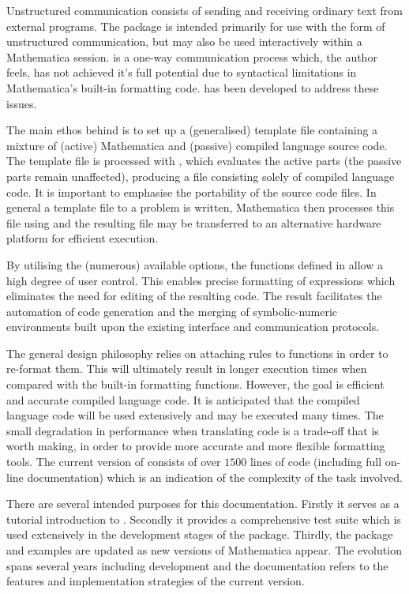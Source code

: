 \documentclass [12pt,twoside]{article}
\begin{document}
Unstructured communication consists of sending and receiving ordinary
text from external programs. The package  is intended
primarily for use with the  form of unstructured
communication, but may also be used interactively within a Mathematica
session.  is a one-way communication process which, the
author feels, has not achieved it's full potential due to syntactical
limitations in Mathematica's built-in formatting code.  has
been developed to address these issues.

The main ethos behind  is to set up a (generalised) template
file containing a mixture of (active) Mathematica and (passive) compiled
language source code. The template file is processed with ,
which evaluates the active parts (the passive parts remain unaffected),
producing a file consisting solely of compiled language code. It is important
to emphasise the portability of the source code files. In general a template
file to a problem is written, Mathematica then processes this file using
 and the resulting file may be transferred to an alternative
hardware platform for efficient execution.

By utilising the (numerous) available options, the functions defined in
 allow a high degree of user control. This enables precise
formatting of expressions which eliminates the need for editing of the resulting
code. The result facilitates the automation of code generation and the merging of
symbolic-numeric environments built upon the existing interface and communication
protocols.

The general design philosophy relies on attaching rules to functions in order
to re-format them. This will ultimately result in longer execution times when
compared with the built-in formatting functions. However, the goal is efficient
and accurate compiled language code. It is anticipated that the compiled language
code will be used extensively and may be executed many times. The small
degradation in performance when translating code is a trade-off that is worth
making, in order to provide more accurate and more flexible formatting tools. The
current version of  consists of over
$1500$ lines of code (including full on-line documentation) which is an
indication of the complexity of the task involved.

There are several intended purposes for this documentation. Firstly it
serves as a tutorial introduction to . Secondly it provides a
comprehensive test suite which is used extensively in the development stages
of the package. Thirdly, the package and examples are updated as new versions of
Mathematica appear. The evolution spans several years including development and
the documentation refers to the features and implementation strategies of the
current version.
\end{document}
